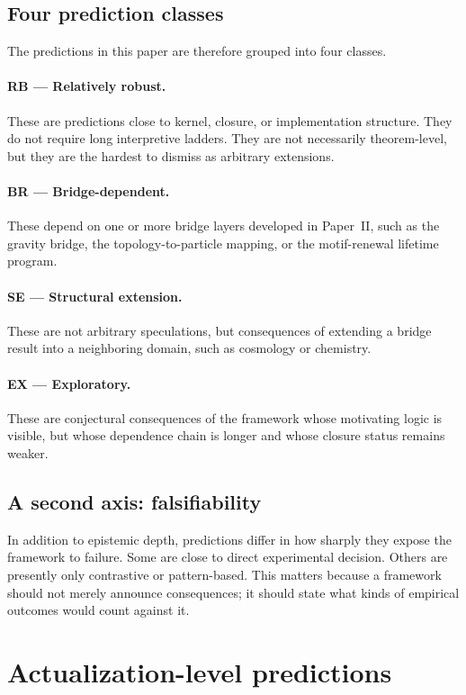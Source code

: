 \documentclass[11pt]{article}
\begin{document}
\subsection{Four prediction classes}
The predictions in this paper are therefore grouped into four classes.

\paragraph{RB --- Relatively robust.}
These are predictions close to kernel, closure, or implementation structure. They do not require long interpretive ladders. They are not necessarily theorem-level, but they are the hardest to dismiss as arbitrary extensions.

\paragraph{BR --- Bridge-dependent.}
These depend on one or more bridge layers developed in Paper~II, such as the gravity bridge, the topology-to-particle mapping, or the motif-renewal lifetime program.

\paragraph{SE --- Structural extension.}
These are not arbitrary speculations, but consequences of extending a bridge result into a neighboring domain, such as cosmology or chemistry.

\paragraph{EX --- Exploratory.}
These are conjectural consequences of the framework whose motivating logic is visible, but whose dependence chain is longer and whose closure status remains weaker.

\subsection{A second axis: falsifiability}
In addition to epistemic depth, predictions differ in how sharply they expose the framework to failure. Some are close to direct experimental decision. Others are presently only contrastive or pattern-based. This matters because a framework should not merely announce consequences; it should state what kinds of empirical outcomes would count against it.

\section{Actualization-level predictions}\label{sec:actualization-preds}
\end{document}
